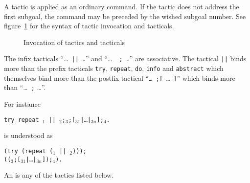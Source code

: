 A tactic is
applied as an ordinary command. If the tactic does not
address the first subgoal, the command may be preceded by the
wished subgoal number. See figure~\ref{InvokeTactic} for the syntax of
tactic invocation and tacticals.

\medskip

\begin{figure}[t]
\begin{center}
\end{center}
\caption{Invocation of tactics and tacticals}
\label{InvokeTactic}
\end{figure}

\begin{Remarks}
\item The infix tacticals ``\dots\ {\tt ||} \dots'' and ``\dots\ {\tt
    ;} \dots'' are associative. 
The tactical {\tt ||} binds more than the prefix tacticals
{\tt try}, {\tt repeat}, {\tt do}, {\tt info} and {\tt abstract} which
themselves bind more than  
the postfix tactical ``{\tt \dots\ ;[ \dots\ ]}'' which 
binds more than ``\dots\ {\tt ;} \dots''.

For instance
\begin{tabbing}
{\tt try repeat \tac$_1$ ||
  \tac$_2$;\tac$_3$;[\tac$_{31}$|\dots|\tac$_{3n}$];\tac$_4$.}
\end{tabbing}
is understood as 
\begin{tabbing}
{\tt (try (repeat (\tac$_1$ || \tac$_2$)));} \\
{\tt ((\tac$_3$;[\tac$_{31}$|\dots|\tac$_{3n}$]);\tac$_4$).}
\end{tabbing}


\item An {\atomictac} is any of the tactics listed below.
\end{Remarks}

